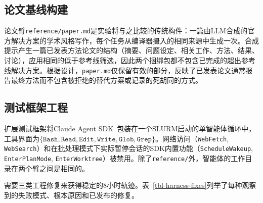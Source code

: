 \subsection{论文基线构建}
\label{sec-extension-paper-baseline}

论文臂\texttt{reference/paper.md}是实验将\ara{}与之比较的传统构件：一篇由LLM合成的官方解决方案的学术风格写作，每个任务从\ara{}编译器摄入的相同来源中生成一次。合成提示产生一篇已发表方法论文的结构（摘要、问题设定、相关工作、方法、结果、讨论），应用相同的低于参考线筛选，因此两个捆绑包都不包含已完成的超出参考线解决方案。根据设计，\texttt{paper.md}仅保留有效的部分，反映了已发表论文通常报告最终方法而不包含被拒绝的替代方案或记录的死胡同的方式。

\subsection{测试框架工程}
\label{sec-extension-harness}

扩展测试框架将Claude Agent SDK~\citep{claudecodesdk2025}包装在一个SLURM启动的单智能体循环中，工具界面为$\{\texttt{Bash}, \texttt{Read}, \texttt{Edit}, \texttt{Write}, \texttt{Glob}, \texttt{Grep}\}$。网络访问（\texttt{WebFetch}, \texttt{WebSearch}）和在批处理模式下实际暂停会话的SDK内置功能（\texttt{ScheduleWakeup}, \texttt{EnterPlanMode}, \texttt{EnterWorktree}）被禁用。除了\texttt{reference/}外，智能体的工作目录在两个臂之间是相同的。

需要三类工程修复来获得稳定的8小时轨迹。表~\ref{tbl-harness-fixes}列举了每种观察到的失败模式、根本原因和已发布的修复。

